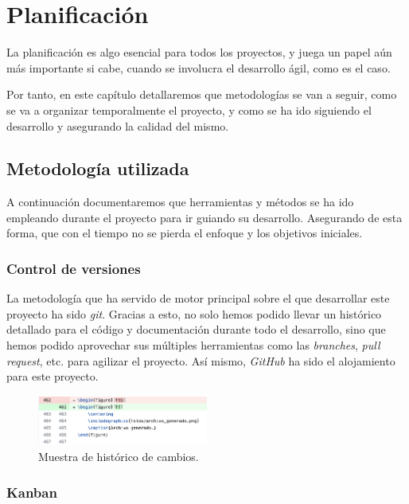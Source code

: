 \chapter{Planificación}

La planificación es algo esencial para todos los proyectos, y juega un papel aún 
más importante si cabe, cuando se involucra el desarrollo ágil, como es el caso. 

Por tanto, en este capítulo detallaremos que metodologías se van a seguir, como 
se va a organizar temporalmente el proyecto, y como se ha ido siguiendo el 
desarrollo y asegurando la calidad del mismo. 

\section{Metodología utilizada}

A continuación documentaremos que herramientas y métodos se ha ido empleando 
durante el proyecto para ir guiando su desarrollo. Asegurando de esta forma, que 
con el tiempo no se pierda el enfoque y los objetivos iniciales. 

\subsection{Control de versiones}

La metodología que ha servido de motor principal sobre el que desarrollar este
proyecto ha sido \emph{git}. Gracias a esto, no solo hemos podido llevar un
histórico detallado para el código y documentación durante todo el desarrollo,
sino que hemos podido aprovechar sus múltiples herramientas como las
\emph{branches}, \emph{pull request}, etc. para agilizar el proyecto. Así mismo,
\emph{GitHub} ha sido el alojamiento para este proyecto.

\begin{figure}[H]
    \centering
    \includegraphics[width=0.5\textwidth]{fotos/control_versiones.png}
    \caption{Muestra de histórico de cambios.}
\end{figure}

\subsection{Kanban}

